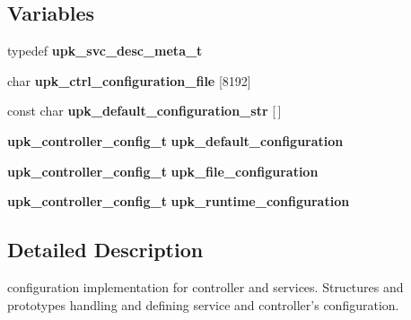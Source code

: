 \subsection*{Variables}
\begin{DoxyCompactItemize}
\item 
typedef {\bf upk\_\-svc\_\-desc\_\-meta\_\-t}
\item 
char {\bf upk\_\-ctrl\_\-configuration\_\-file} [8192]
\item 
const char {\bf upk\_\-default\_\-configuration\_\-str} [$\,$]
\item 
{\bf upk\_\-controller\_\-config\_\-t} {\bf upk\_\-default\_\-configuration}
\item 
{\bf upk\_\-controller\_\-config\_\-t} {\bf upk\_\-file\_\-configuration}
\item 
{\bf upk\_\-controller\_\-config\_\-t} {\bf upk\_\-runtime\_\-configuration}
\end{DoxyCompactItemize}


\subsection{Detailed Description}
configuration implementation for controller and services. Structures and prototypes handling and defining service and controller's configuration. 